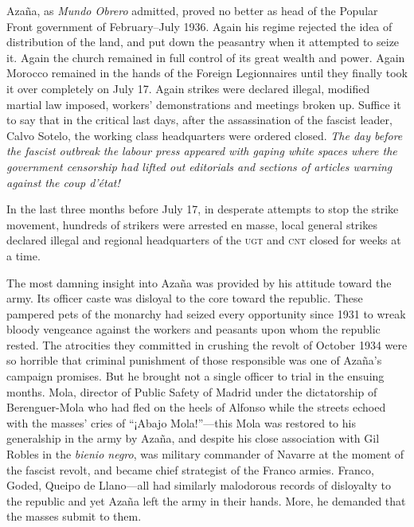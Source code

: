 Azaña, as \emph{Mundo Obrero} admitted, proved no better as head of the Popular Front government of February--July 1936. Again his regime rejected the idea of distribution of the land, and put down the peasantry when it attempted to seize it. Again the church remained in full control of its great wealth and power. Again Morocco remained in the hands of the Foreign Legionnaires until they finally took it over completely on July 17. Again strikes were declared illegal, modified martial law imposed, workers’ demonstrations and meetings broken up. Suffice it to say that in the critical last days, after the assassination of the fascist leader, Calvo Sotelo, the working class headquarters were ordered closed. \emph{The day before the fascist outbreak the labour press appeared with gaping white spaces where the government censorship had lifted out editorials and sections of articles warning against the \emph{coup d’\'etat}!}

In the last three months before July 17, in desperate attempts to stop the strike movement, hundreds of strikers were arrested en masse, local general strikes declared illegal and regional headquarters of the \textsc{ugt} and \textsc{cnt} closed for weeks at a time.

The most damning insight into Azaña was provided by his attitude toward the army. Its officer caste was disloyal to the core toward the republic. These pampered pets of the monarchy had seized every opportunity since 1931 to wreak bloody vengeance against the workers and peasants upon whom the republic rested. The atrocities they committed in crushing the revolt of October 1934 were so horrible that criminal punishment of those responsible was one of Azaña’s campaign promises. But he brought not a single officer to trial in the ensuing months. Mola, director of Public Safety of Madrid under the dictatorship of Berenguer-Mola who had fled on the heels of Alfonso while the streets echoed with the masses’ cries of ``¡Abajo Mola!''---this Mola was restored to his generalship in the army by Azaña, and despite his close association with Gil Robles in the \emph{bienio negro}, was military commander of Navarre at the moment of the fascist revolt, and became chief strategist of the Franco armies. Franco, Goded, Queipo de Llano---all had similarly malodorous records of disloyalty to the republic and yet Azaña left the army in their hands. More, he demanded that the masses submit to them.

